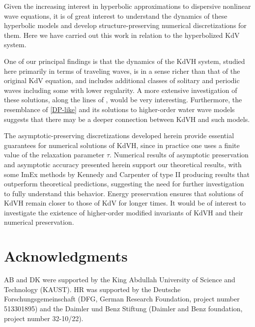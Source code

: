 \documentclass{article}
\begin{document}
Given the increasing interest in hyperbolic approximations to dispersive nonlinear
wave equations, it is of great interest to understand the dynamics of these
hyperbolic models and develop structure-preserving numerical discretizations
for them.  Here we have carried out this work in relation to the hyperbolized KdV
system.

One of our principal findings is that the dynamics of the KdVH system, studied here
primarily in terms of traveling waves, is in a sense richer than that of the original
KdV equation, and includes additional classes of solitary and periodic waves
including some with lower regularity.  A more extensive investigation of these solutions,
along the lines of \cite{lenells2005traveling}, would be very interesting.
Furthermore, the resemblance of \eqref{DP-like} and its solutions to higher-order water wave models
suggests that there may be a deeper connection between KdVH and such models.

The asymptotic-preserving discretizations developed herein provide essential
guarantees for numerical solutions of KdVH, since in practice one uses a finite
value of the relaxation parameter $\tau$.
Numerical results of asymptotic preservation and asymptotic accuracy presented
herein support our theoretical results, with some ImEx methods by Kennedy and Carpenter
of type II \cite{kennedy2003additive} producing results that outperform theoretical predictions,
suggesting the need for further investigation to fully understand this behavior.
Energy preservation ensures that solutions of KdVH remain closer to those of KdV for longer times.
It would be of interest to investigate the existence of higher-order modified invariants
of KdVH and their numerical preservation.


\section*{Acknowledgments}

AB and DK were supported by the
King Abdullah University of Science and Technology (KAUST).
HR was supported by the Deutsche Forschungsgemeinschaft
(DFG, German Research Foundation, project number 513301895)
and the Daimler und Benz Stiftung (Daimler and Benz foundation,
project number 32-10/22).






\appendix
\end{document}
